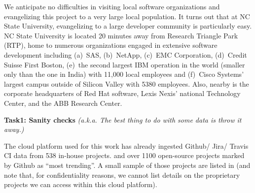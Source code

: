 We anticipate no difficulties in visiting local software organizations
and evangelizing this project to a very large local population. It turns out that at NC State University, evangelizing to a large developer community is particularly
easy. NC State University is located 20 minutes away from Research Triangle Park (RTP),
home to 
numerous organizations engaged in extensive software
development including
(a)~SAS,   (b)~NetApp, (c)~EMC Corporation, (d)~Credit Suisse First Boston,  
(e)~the second largest IBM operation 
in the world (smaller only than the one in India)
with 11,000  local employees
and (f)~Cisco Systems' largest campus outside of
Silicon Valley with 5380 employees.  Also, nearby is the corporate headquarters
of Red Hat software,  Lexis Nexis' national   Technology Center, and the ABB Research Center. 
 
\noindent
{\bf Task1: Sanity checks} {\em (a.k.a. The best thing to do with some data is throw it away.)}


% 


The cloud platform used 
for this work has already ingested Github/ Jira/ Travis CI  data from
538 in-house projects.
and over 1100 open-source projects
marked by Github as ``most trending''. A small sample of those projects are listed in 
 (and note that, for confidentiality reasons,
we cannot list details on the proprietary projects we can access within this cloud platform).
 

